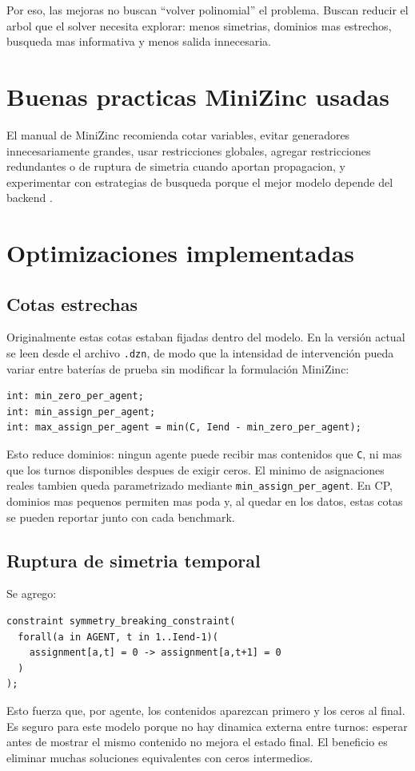 \documentclass[11pt,a4paper]{article}
\begin{document}
Por eso, las mejoras no buscan ``volver polinomial'' el problema. Buscan reducir el arbol que el solver necesita explorar: menos simetrias, dominios mas estrechos, busqueda mas informativa y menos salida innecesaria.

\section{Buenas practicas MiniZinc usadas}
El manual de MiniZinc recomienda cotar variables, evitar generadores innecesariamente grandes, usar restricciones globales, agregar restricciones redundantes o de ruptura de simetria cuando aportan propagacion, y experimentar con estrategias de busqueda porque el mejor modelo depende del backend \cite{minizinc-efficient,minizinc-search,minizinc-globals}.

\section{Optimizaciones implementadas}
\subsection{Cotas estrechas}
Originalmente estas cotas estaban fijadas dentro del modelo. En la versi\'on actual se leen desde el archivo \texttt{.dzn}, de modo que la intensidad de intervenci\'on pueda variar entre bater\'ias de prueba sin modificar la formulaci\'on MiniZinc:
\begin{lstlisting}
int: min_zero_per_agent;
int: min_assign_per_agent;
int: max_assign_per_agent = min(C, Iend - min_zero_per_agent);
\end{lstlisting}
Esto reduce dominios: ningun agente puede recibir mas contenidos que \texttt{C}, ni mas que los turnos disponibles despues de exigir ceros. El minimo de asignaciones reales tambien queda parametrizado mediante \texttt{min\_assign\_per\_agent}. En CP, dominios mas pequenos permiten mas poda y, al quedar en los datos, estas cotas se pueden reportar junto con cada benchmark.

\subsection{Ruptura de simetria temporal}
Se agrego:
\begin{lstlisting}
constraint symmetry_breaking_constraint(
  forall(a in AGENT, t in 1..Iend-1)(
    assignment[a,t] = 0 -> assignment[a,t+1] = 0
  )
);
\end{lstlisting}
Esto fuerza que, por agente, los contenidos aparezcan primero y los ceros al final. Es seguro para este modelo porque no hay dinamica externa entre turnos: esperar antes de mostrar el mismo contenido no mejora el estado final. El beneficio es eliminar muchas soluciones equivalentes con ceros intermedios.
\end{document}
